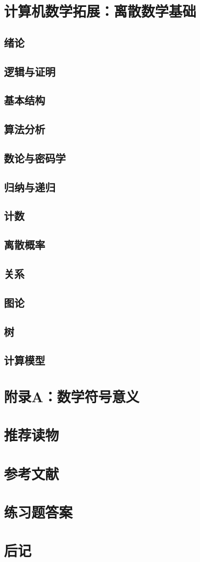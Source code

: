 \documentclass[UTF8]{article}
\begin{document}
    \section{计算机数学拓展：离散数学基础}
        \subsection{绪论}
        \subsection{逻辑与证明}
        \subsection{基本结构}
        \subsection{算法分析}
        \subsection{数论与密码学}
        \subsection{归纳与递归}
        \subsection{计数}
        \subsection{离散概率}
        \subsection{关系}
        \subsection{图论}
        \subsection{树}
        \subsection{计算模型}
    \newpage
    \section{附录A：数学符号意义}
    \section{推荐读物}
    \section{参考文献}
    \section{练习题答案}
    \section{后记}
\end{document}
